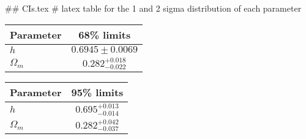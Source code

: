 ## CIs.tex
# latex table for the 1 and 2 sigma distribution of each parameter

\begin{tabular} { l  c}
 Parameter &  68\% limits\\
\hline
{\boldmath$h              $} & $0.6945\pm 0.0069          $\\
{\boldmath$\Omega_m       $} & $0.282^{+0.018}_{-0.022}   $\\
\hline
\end{tabular}

\begin{tabular} { l  c}
 Parameter &  95\% limits\\
\hline
{\boldmath$h              $} & $0.695^{+0.013}_{-0.014}   $\\
{\boldmath$\Omega_m       $} & $0.282^{+0.042}_{-0.037}   $\\
\hline
\end{tabular}
